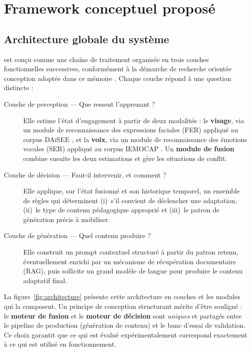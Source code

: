 \section{Framework conceptuel proposé}
\label{sec:framework}

\subsection{Architecture globale du système}

\emolearn{} est conçu comme une chaîne de traitement organisée en trois couches
fonctionnelles successives, conformément à la démarche de recherche orientée
conception adoptée dans ce mémoire \cite{hevner2004design}. Chaque couche répond
à une question distincte :

\begin{description}
  \item[Couche de perception — \og Que ressent l'apprenant ? \fg] Elle estime
  l'état d'engagement à partir de deux modalités : le \textbf{visage}, via un
  module de reconnaissance des expressions faciales (FER) appliqué au corpus
  \textsc{DAiSEE} \cite{gupta2016daisee}, et la \textbf{voix}, via un module de
  reconnaissance des émotions vocales (SER) appliqué au corpus \textsc{IEMOCAP}
  \cite{busso2008iemocap}. Un \textbf{module de fusion} combine ensuite les deux
  estimations et gère les situations de conflit.

  \item[Couche de décision — \og Faut-il intervenir, et comment ? \fg] Elle
  applique, sur l'état fusionné et son historique temporel, un ensemble de règles
  qui déterminent (i)~s'il convient de déclencher une adaptation, (ii)~le type de
  contenu pédagogique approprié et (iii)~le patron de génération précis à
  mobiliser.

  \item[Couche de génération — \og Quel contenu produire ? \fg] Elle construit un
  prompt contextuel structuré à partir du patron retenu, éventuellement enrichi
  par un mécanisme de récupération documentaire (RAG), puis sollicite un grand
  modèle de langue pour produire le contenu adaptatif final.
\end{description}

La figure~\ref{fig:architecture} présente cette architecture en couches et les
modules qui la composent. Un principe de conception structurant mérite d'être
souligné : le \textbf{moteur de fusion} et le \textbf{moteur de décision} sont
\emph{uniques} et partagés entre le pipeline de production (génération de contenu)
et le banc d'essai de validation. Ce choix garantit que ce qui est évalué
expérimentalement correspond exactement à ce qui est utilisé en fonctionnement.

